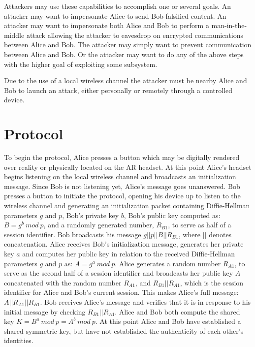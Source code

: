 \documentclass[12pt]{report}
\begin{document}
Attackers may use these capabilities to accomplish one or several goals. An attacker may want to impersonate Alice to send Bob falsified content. An attacker may want to impersonate both Alice and Bob to perform a man-in-the-middle attack allowing the attacker to eavesdrop on encrypted communications between Alice and Bob. The attacker may simply want to prevent communication between Alice and Bob. Or the attacker may want to do any of the above steps with the higher goal of exploiting some subsystem. \par

Due to the use of a local wireless channel the attacker must be nearby Alice and Bob to launch an attack, either personally or remotely through a controlled device. \par

\section{Protocol}
To begin the protocol, Alice presses a button which may be digitally rendered over reality or physically located on the AR headset. At this point Alice's headset begins listening on the local wireless channel and broadcasts an initialization message. Since Bob is not listening yet, Alice's message goes unanswered. Bob presses a button to initiate the protocol, opening his device up to listen to the wireless channel and generating an initialization packet containing Diffie-Hellman parameters $g$ and $p$, Bob's private key $b$, Bob's public key computed as: $B = g^b \: mod \: p$, and a randomly generated number, $R_{B1}$, to serve as half of a session identifier. Bob broadcasts his message $g || p || B || R_{B1}$, where $||$ denotes concatenation. Alice receives Bob's initialization message, generates her private key $a$ and computes her public key in relation to the received Diffie-Hellman parameters $g$ and $p$ as: $A = g^a \: mod \: p$. Alice generates a random number $R_{A1}$, to serve as the second half of a session identifier and broadcasts her public key $A$ concatenated with the random number $R_{A1}$, and $R_{B1} || R_{A1}$, which is the session identifier for Alice and Bob's current session. This makes Alice's full message: $A || R_{A1} || R_{B1}$. Bob receives Alice's message and verifies that it is in response to his initial message by checking $R_{B1} || R_{A1}$. Alice and Bob both compute the shared key $K = B^a \: mod \: p = A^b \: mod \: p$. At this point Alice and Bob have established a shared symmetric key, but have not established the authenticity of each other's identities. \par
\end{document}
